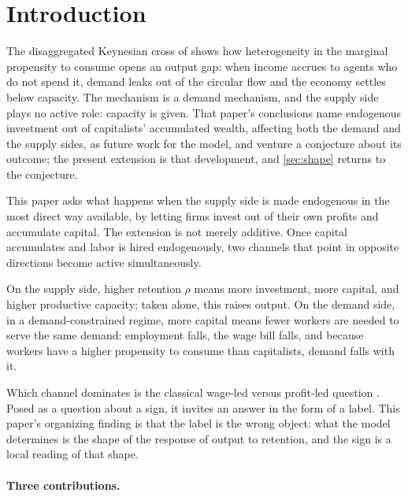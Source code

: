 
\section{Introduction}
\label{sec:intro}

The disaggregated Keynesian cross of \citet{Teglio2025} shows how heterogeneity in the marginal propensity to consume opens an output gap: when income accrues to agents who do not spend it, demand leaks out of the circular flow and the economy settles below capacity. The mechanism is a demand mechanism, and the supply side plays no active role: capacity is given.
That paper's conclusions name endogenous investment out of capitalists' accumulated wealth, affecting both the demand and the supply sides, as future work for the model, and venture a conjecture about its outcome; the present extension is that development, and \cref{sec:shape} returns to the conjecture.

This paper asks what happens when the supply side is made endogenous in the most direct way available, by letting firms invest out of their own profits and accumulate capital. The extension is not merely additive. Once capital accumulates and labor is hired endogenously, two channels that point in opposite directions become active simultaneously.

On the supply side, higher retention $\rho$ means more investment, more capital, and higher productive capacity; taken alone, this raises output. On the demand side, in a demand-constrained regime, more capital means fewer workers are needed to serve the same demand: employment falls, the wage bill falls, and because workers have a higher propensity to consume than capitalists, demand falls with it.

Which channel dominates is the classical wage-led versus profit-led question \citep{BhaduriMarglin1990,LavoieStockhammer2013}. Posed as a question about a sign, it invites an answer in the form of a label. This paper's organizing finding is that the label is the wrong object: what the model determines is the shape of the response of output to retention, and the sign is a local reading of that shape.

\paragraph{Three contributions.}

